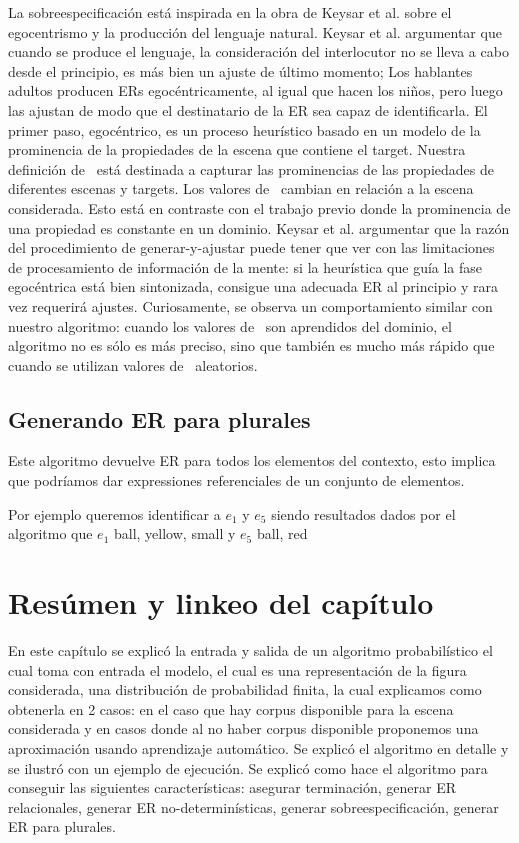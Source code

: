 La sobreespecificaci\'on est\'a inspirada en la obra de Keysar et al. \cite{keysar:Curr98} sobre el egocentrismo y la producci\'on del lenguaje natural. 
Keysar et al. argumentar que cuando se produce el lenguaje, la consideraci\'on del interlocutor no se lleva a cabo desde el principio, 
es m\'as bien un ajuste de \'ultimo momento; Los hablantes adultos producen ERs egoc\'entricamente, al igual que hacen los ni\~nos, 
pero luego las ajustan de modo que el destinatario de la ER sea capaz de identificarla. El primer paso, egoc\'entrico, es un proceso
heur\'istico basado en un modelo de la prominencia de la propiedades de la escena que contiene el target. Nuestra definici\'on de
\puse\ est\'a destinada a capturar las prominencias de las propiedades de diferentes escenas y targets. Los valores de \puse\
cambian en relaci\'on a la escena considerada. Esto est\'a en contraste con el trabajo previo donde
la prominencia de una propiedad es constante en un dominio. Keysar et al. argumentar que la raz\'on del procedimiento de 
generar-y-ajustar puede tener que ver con las limitaciones de procesamiento de informaci\'on de la
mente: si la heur\'istica que gu\'ia la fase egoc\'entrica est\'a bien sintonizada, consigue una adecuada ER al principio
y rara vez requerir\'a ajustes. Curiosamente, se observa un comportamiento similar
con nuestro algoritmo: cuando los valores de \puse\ son
aprendidos del dominio, el algoritmo no es
s\'olo es m\'as preciso, sino que tambi\'en es mucho m\'as r\'apido que cuando se utilizan valores de \puse\ aleatorios.


\subsection{Generando ER para plurales}

Este algoritmo devuelve ER para todos los elementos del contexto, 
esto implica que podr\'iamos dar expressiones referenciales de un conjunto de elementos.

Por ejemplo queremos identificar a $e_1$ y $e_5$ 
siendo resultados dados por el algoritmo que $e_1$
ball, yellow, small
y $e_5$ ball, red


\section{Res\'umen y linkeo del cap\'itulo}
\label{sec:link-algoritmo}

En este cap\'itulo se explic\'o la entrada y salida de un algoritmo probabil\'istico el cual toma con entrada el modelo, el cual es una representaci\'on de la figura considerada, una distribuci\'on de probabilidad finita, la cual explicamos como obtenerla en 2 casos: en el caso que hay corpus disponible para la escena considerada y en casos donde al no haber corpus disponible proponemos una aproximaci\'on usando aprendizaje autom\'atico. Se explic\'o el algoritmo en detalle y se ilustr\'o con un ejemplo de ejecuci\'on. Se explic\'o como hace el algoritmo para conseguir las siguientes caracter\'isticas: asegurar terminaci\'on, generar ER relacionales, generar ER no-determin\'isticas, generar sobreespecificaci\'on, generar ER para plurales.


